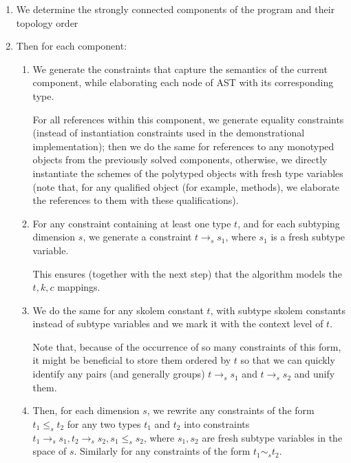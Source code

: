\begin{enumerate}
    \item We determine the strongly connected components of the program and their topology order 

    \item Then for each component:

    \begin{enumerate}
        \item We generate the constraints that capture the semantics of the current component, while elaborating each node of AST with its corresponding type.

        For all references within this component, we generate equality constraints (instead of instantiation constraints used in the demonstrational implementation); then we do the same for references to any monotyped objects from the previously solved components, otherwise, we directly instantiate the schemes of the polytyped objects with fresh type variables (note that, for any qualified object (for example, methods), we elaborate the references to them with these qualifications).

        \item For any constraint containing at least one type $t$, and for each subtyping dimension $s$, we generate a constraint $t \to_s s_1$, where $s_1$ is a fresh subtype variable.

        This ensures (together with the next step) that the algorithm models the $t, k, c$ mappings.

        \item We do the same for any skolem constant $t$, with subtype skolem constants instead of subtype variables and we mark it with the context level of $t$. \label{gen_subskolem}

        Note that, because of the occurrence of so many constraints of this form, it might be beneficial to store them ordered by $t$ so that we can quickly identify any pairs (and generally groups) $t \to_s s_1$ and $t \to_s s_2$ and unify them. \label{mapping_once}


        \item Then, for each dimension $s$, we rewrite any constraints of the form $t_1 \leq_s t_2$ for any two types $t_1$ and $t_2$ into constraints $t_1 \to_s s_1, t_2 \to_s s_2, s_1 \leq_s s_2$, where $s_1, s_2$ are fresh subtype variables in the space of $s$. Similarly for any constraints of the form $t_1 \sim_s t_2$.


\end{enumerate}
\end{enumerate}
